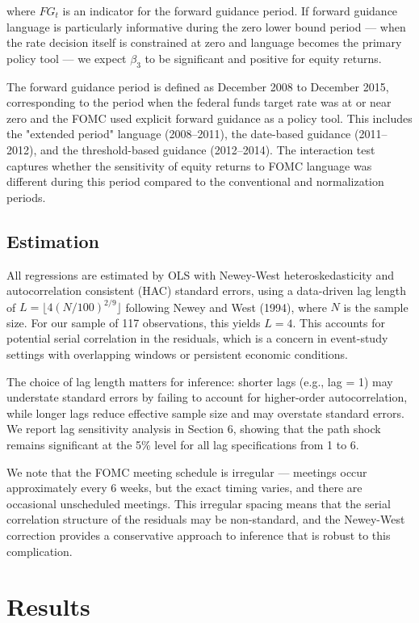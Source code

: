 \documentclass[12pt]{article}
\begin{document}
where $FG_t$ is an indicator for the forward guidance period. If forward guidance language is particularly informative during the zero lower bound period --- when the rate decision itself is constrained at zero and language becomes the primary policy tool --- we expect $\beta_3$ to be significant and positive for equity returns.

The forward guidance period is defined as December 2008 to December 2015, corresponding to the period when the federal funds target rate was at or near zero and the FOMC used explicit forward guidance as a policy tool. This includes the "extended period" language (2008--2011), the date-based guidance (2011--2012), and the threshold-based guidance (2012--2014). The interaction test captures whether the sensitivity of equity returns to FOMC language was different during this period compared to the conventional and normalization periods.

\subsection{Estimation}

All regressions are estimated by OLS with Newey-West heteroskedasticity and autocorrelation consistent (HAC) standard errors, using a data-driven lag length of $L = \lfloor 4(N/100)^{2/9} \rfloor$ following Newey and West (1994), where $N$ is the sample size. For our sample of 117 observations, this yields $L = 4$. This accounts for potential serial correlation in the residuals, which is a concern in event-study settings with overlapping windows or persistent economic conditions.

The choice of lag length matters for inference: shorter lags (e.g., lag = 1) may understate standard errors by failing to account for higher-order autocorrelation, while longer lags reduce effective sample size and may overstate standard errors. We report lag sensitivity analysis in Section 6, showing that the path shock remains significant at the 5\% level for all lag specifications from 1 to 6.

We note that the FOMC meeting schedule is irregular --- meetings occur approximately every 6 weeks, but the exact timing varies, and there are occasional unscheduled meetings. This irregular spacing means that the serial correlation structure of the residuals may be non-standard, and the Newey-West correction provides a conservative approach to inference that is robust to this complication.


\section{Results}
\end{document}
